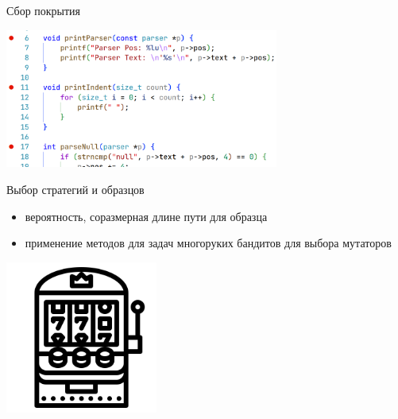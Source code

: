 \documentclass[hyperref={unicode=true}, 12pt]{beamer}
\begin{document}
	\begin{frame}[c]{Сбор покрытия}
			
		\centering \includegraphics[width=9cm]{breakpoints.png}
			
	\end{frame}

	
	\begin{frame}[t]{Выбор стратегий и образцов}
		\begin{minipage}{0.55\textwidth}
			
			\vspace{1.1cm}
			
			\begin{itemize}
				\item вероятность, соразмерная длине пути для образца
				
				\item применение методов для задач многоруких бандитов для выбора мутаторов
			\end{itemize}
			
			
		\end{minipage}\begin{minipage}{0.45\textwidth}
			\vspace{1.1cm}
			\includegraphics[width=5cm]{bandit.png}
		\end{minipage}
	\end{frame}
\end{document}
